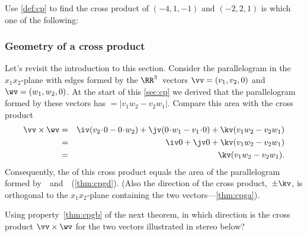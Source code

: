 \begin{activity} 
Use \cref{def:cp} to find the cross product of \((-4,1,-1)\) and \((-2,2,1)\) is which one of the following:
\end{activity}




\subsubsection{Geometry of a cross product}


\begin{example} \label{eg:cppara}
Let's revisit the introduction to this section.
Consider the parallelogram in the \(x_1x_2\)-plane with edges formed by the \(\RR^3\)~vectors \(\vv=(v_1,v_2,0)\) and \(\wv=(w_1,w_2,0)\).
At the start of this \cref{sec:cp} we derived that the parallelogram formed by these vectors has \({}=|v_1w_2-v_2w_1|\).
Compare this area with the cross product
\begin{eqnarray*}
\vv\times\wv&=&\iv(v_2\cdot0-0\cdot w_2)
+\jv(0\cdot w_1-v_1\cdot0)
+\kv(v_1w_2-v_2w_1)
\\&=&\iv0+\jv0+\kv(v_1w_2-v_2w_1)
\\&=&\kv(v_1w_2-v_2w_1).
\end{eqnarray*}
Consequently, the  of this cross product equals the area of the parallelogram formed by~\vv\ and~\wv\ (\cref{thm:cpgd}).
(Also the direction of the cross product,~\(\pm\kv\), is orthogonal to the \(x_1x_2\)-plane containing the two vectors---\cref{thm:cpga}).
\end{example}



\begin{activity}
Using property~\ref{thm:cpgb} of the next theorem, in which direction is the cross product \(\vv\times\wv\) for the two vectors illustrated in stereo below?
\begin{center}
\end{center}
\actposs[4]{\(-\jv\)}{\(+\iv\)}{\(+\jv\)}{\(-\iv\)}
\end{activity}




